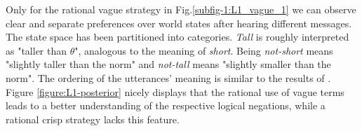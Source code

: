 Only for the rational vague strategy in Fig.\ref{subfig-1:L1_vague_1} we can observe clear and separate preferences over world states after hearing different messages. The state space has been partitioned into categories. \textit{Tall} is roughly interpreted as "taller than $\theta$", analogous to the meaning of \textit{short}. Being \textit{not-short} means "slightly taller than the norm" and \textit{not-tall} means "slightly smaller than the norm".
The ordering of the utterances' meaning is similar to the results of \cite{tesslernot}.
Figure \ref{figure:L1-posterior} nicely displays that the rational use of vague terms leads to a better understanding of the respective logical negations, while a rational crisp strategy lacks this feature.
